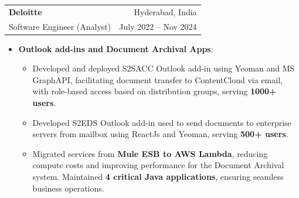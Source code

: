 \documentclass[letterpaper,10pt]{article}
\makeatletter
\newcommand{\resumeItem}[2]{
  \item\small{
    \textbf{#1}{:} 
  \begin{itemize}[label=\textbullet, leftmargin=8pt, itemsep=3pt]
      #2
    \end{itemize}
    }
}
\newcommand{\resumeSubheading}[4]{
  \item
    \begin{tabular*}{0.97\textwidth}{l@{\extracolsep{\fill}}r}
      \textbf{#1} & {\small #2} \\
      {\small#3} & {\small #4} \\
    \end{tabular*}
}
\newcommand{\resumeItemListStart}{\begin{itemize}[leftmargin=6pt, itemindent=0pt, labelsep=4pt]}
\newcommand{\resumeItemListEnd}{\end{itemize}}
\makeatother
\begin{document}
    \resumeSubheading
        {Deloitte}{Hyderabad, India}
        {Software Engineer (Analyst)}{July 2022 -- Nov 2024}
        \resumeItemListStart
            \resumeItem{Outlook add-ins and Document Archival Apps}
            {
                \item Developed and deployed S2SACC Outlook add-in using Yeoman and MS GraphAPI, facilitating document transfer to ContentCloud via email, with role-based access based on distribution groups, serving \textbf{1000+ users}.
                
                \item Developed S2EDS Outlook add-in used to send documents to enterprise servers from mailbox using ReactJs and Yeoman, serving \textbf{500+ users}.

                \item Migrated services from \textbf{Mule ESB to AWS Lambda}, reducing compute costs and improving performance for the Document Archival system. Maintained \textbf{4 critical Java applications}, ensuring seamless business operations.
                
            }
        \resumeItemListEnd
        
\end{document}

